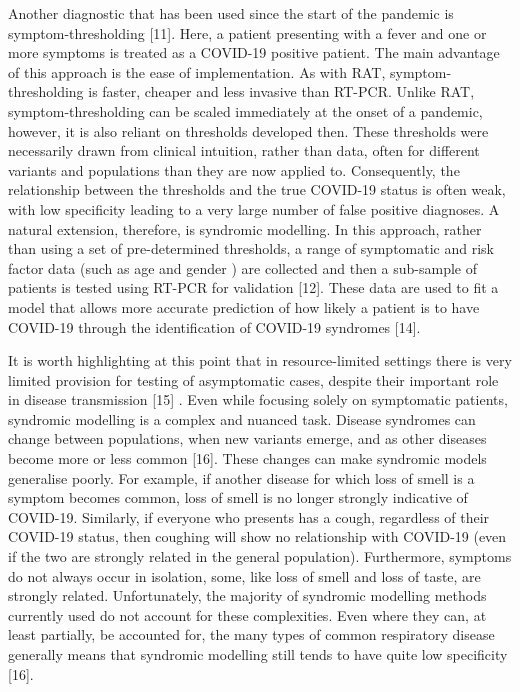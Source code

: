 \documentclass[]{elsarticle} %
\begin{document}
Another diagnostic that has been used since the start of the pandemic is symptom-thresholding {[}11{]}. 
Here, a patient presenting with a fever and one or more symptoms is treated as a COVID-19 positive patient.
The main advantage of this approach is the ease of implementation.
As with RAT, symptom-thresholding is faster, cheaper and less invasive than RT-PCR.
Unlike RAT, symptom-thresholding can be scaled immediately at the onset of a pandemic, however, it is also reliant on thresholds developed then.
These thresholds were necessarily drawn from clinical intuition, rather than data, often for different variants and populations than they are now applied to.
Consequently, the relationship between the thresholds and the true COVID-19 status is often weak, with low specificity leading to a very large number of false positive diagnoses.
A natural extension, therefore, is syndromic modelling.
In this approach, rather than using a set of pre-determined thresholds, a range of symptomatic and risk factor data (such as age and gender ) are collected and then a sub-sample of patients is tested using RT-PCR for validation {[}12{]}.
These data are used to fit a model that allows more accurate prediction of how likely a patient is to have COVID-19 through the identification of COVID-19 syndromes {[}14{]}.

It is worth highlighting at this point that in resource-limited settings there is very limited provision for testing of asymptomatic cases, despite their important role in disease transmission {[}15{]} .
Even while focusing solely on symptomatic patients, syndromic modelling is a complex and nuanced task.
Disease syndromes can change between populations, when new variants emerge, and as other diseases become more or less common {[}16{]}.
These changes can make syndromic models generalise poorly.
For example, if another disease for which loss of smell is a symptom becomes common, loss of smell is no longer strongly indicative of COVID-19.
Similarly, if everyone who presents has a cough, regardless of their COVID-19 status, then coughing will show no relationship with COVID-19 (even if the two are strongly related in the general population). 
Furthermore, symptoms do not always occur in isolation, some, like loss of smell and loss of taste, are strongly related.
Unfortunately, the majority of syndromic modelling methods currently used do not account for these complexities.
Even where they can, at least partially, be accounted for, the many types of common respiratory disease generally means that syndromic modelling still tends to have quite low specificity {[}16{]}.
\end{document}
